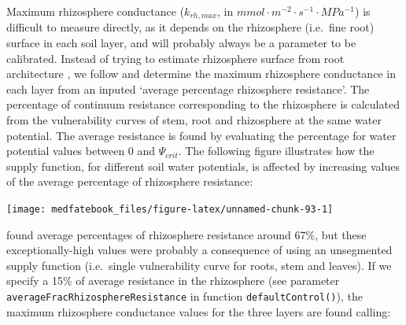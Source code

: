\documentclass[]{book}
\begin{document}
Maximum rhizosphere conductance (\(k_{rh, max}\), in
\(mmol \cdot m^{-2} \cdot s^{-1} \cdot MPa^{-1}\)) is difficult to
measure directly, as it depends on the rhizosphere (i.e.~fine root)
surface in each soil layer, and will probably always be a parameter to
be calibrated. Instead of trying to estimate rhizosphere surface from
root architecture \citep{Sperry1998}, we follow \citet{Sperry2016a} and
determine the maximum rhizosphere conductance in each layer from an
inputed `average percentage rhizosphere resistance'. The percentage of
continuum resistance corresponding to the rhizosphere is calculated from
the vulnerability curves of stem, root and rhizosphere at the same water
potential. The average resistance is found by evaluating the percentage
for water potential values between 0 and \(\Psi_{crit}\). The following
figure illustrates how the supply function, for different soil water
potentials, is affected by increasing values of the average percentage
of rhizosphere resistance:

\begin{center}\texttt{[image: medfatebook\_files/figure-latex/unnamed-chunk-93-1]} \end{center}

\citet{Sperry2016a} found average percentages of rhizosphere resistance
around 67\%, but these exceptionally-high values were probably a
consequence of using an unsegmented supply function (i.e.~single
vulnerability curve for roots, stem and leaves). If we specify a 15\% of
average resistance in the rhizosphere (see parameter
\texttt{averageFracRhizosphereResistance} in function
\texttt{defaultControl()}), the maximum rhizosphere conductance values
for the three layers are found calling:
\end{document}
